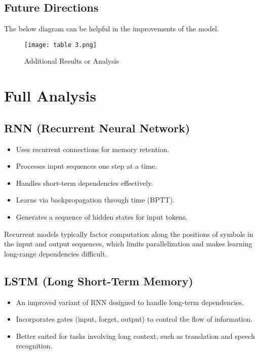 \documentclass{article}
\begin{document}
\subsection{Future Directions}
The below diagram can be helpful in the improvements of the model.
\begin{figure}[ht]
    \centering
    \texttt{[image: table 3.png]} 
    \caption{Additional Results or Analysis}
    \label{fig:table3}
\end{figure}

\section{Full Analysis}

\subsection{RNN (Recurrent Neural Network)}

\begin{itemize}
    \item Uses recurrent connections for memory retention.
    \item Processes input sequences one step at a time.
    \item Handles short-term dependencies effectively.
    \item Learns via backpropagation through time (BPTT).
    \item Generates a sequence of hidden states for input tokens.
\end{itemize}

Recurrent models typically factor computation along the positions of symbols in the input and output sequences, which limits parallelization and makes learning long-range dependencies difficult.

\subsection{LSTM (Long Short-Term Memory)}

\begin{itemize}
    \item An improved variant of RNN designed to handle long-term dependencies.
    \item Incorporates gates (input, forget, output) to control the flow of information.
    \item Better suited for tasks involving long context, such as translation and speech recognition.
\end{itemize}
\end{document}
